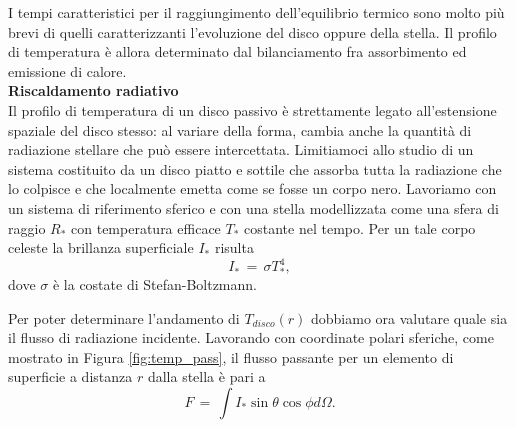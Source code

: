 I tempi caratteristici per il raggiungimento dell'equilibrio termico sono molto più brevi di quelli caratterizzanti l'evoluzione del disco oppure della stella. Il profilo di temperatura è allora determinato dal bilanciamento fra assorbimento ed emissione di calore.\\

\textbf{Riscaldamento radiativo}\\

Il profilo di temperatura di un disco passivo è strettamente legato all'estensione spaziale del disco stesso: al variare della forma, cambia anche la quantità di radiazione stellare che può essere intercettata. Limitiamoci allo studio di un sistema costituito da un disco piatto e sottile che assorba tutta la radiazione che lo colpisce e che localmente emetta come se fosse un corpo nero. Lavoriamo con un sistema di riferimento sferico e con una stella modellizzata come una sfera di raggio $R_{\ast}$ con temperatura efficace $T_{\ast}$ costante nel tempo. Per un tale corpo celeste la brillanza superficiale $I_\ast$ risulta
\begin{equation}
I_\ast\,=\,\sigma T_\ast^4, 
\label{eq:lum_star}
\end{equation}
dove $\sigma$ è la costate di Stefan-Boltzmann.

Per poter determinare l'andamento di $T_{disco}\left(r\right)$ dobbiamo ora valutare quale sia il flusso di radiazione incidente. 
Lavorando con coordinate polari sferiche, come mostrato in Figura \ref{fig:temp_pass}, il flusso passante per un elemento di superficie a distanza $r$ dalla stella è pari a
\begin{equation}
F\,=\,\int I_\ast \sin{\theta} \cos{\phi} d\Omega.
\label{eq:in_flux}
\end{equation}

